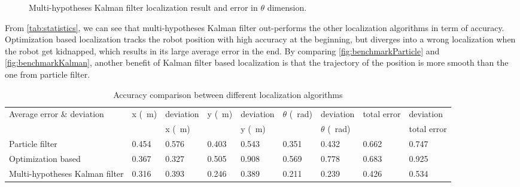 \begin{figure}[!htbp]
  \centering
    \begin{subfigure}[b]{0.9\textwidth}
      
    \end{subfigure}
    \begin{subfigure}[b]{0.9\textwidth}
      
    \end{subfigure}
  \caption{Multi-hypotheses Kalman filter localization result and error in $\theta$ dimension.}
 \label{fig:benchmarkKalman2}
\end{figure}
From \autoref{tab:statistics}, we can see that multi-hypotheses Kalman filter out-performs the other localization algorithms in term of accuracy. Optimization based localization tracks the robot position with high accuracy at the beginning, but diverges into a wrong localization when the robot get kidnapped, which results in its large average error in the end.
By comparing \autoref{fig:benchmarkParticle} and \autoref{fig:benchmarkKalman}, another benefit of Kalman filter based localization is that the trajectory of the position is more smooth than the one from particle filter.
\begin{table}[h!]
  \centering
  \caption{Accuracy comparison between different localization algorithms}
  \label{tab:statistics}
  \begin{adjustbox}{max width=\textwidth}
    \begin{tabular}{l|l|l|l|l|l|l|l|l}
      Average error  \& deviation & x (\SI{}{\meter})                   &  deviation     & y  (\SI{}{\meter})                   & deviation        & $\theta$  (\SI{}{\radian})            &deviation    & total error         &deviation           \\
      &                     & x (\SI{}{\meter})&                     &  y (\SI{}{\meter})&                     &  $\theta$ (\SI{}{\radian}) &                     & total error\\ \hline
      Particle filter                & 0.454& 0.576 & 0.403 & 0.543 & 0.351 & 0.432 & 0.662 & 0.747   \\ \hline
      Optimization based            & 0.367 & 0.327 & 0.505 & 0.908 & 0.569 & 0.778 & 0.683 & 0.925   \\ \hline
      Multi-hypotheses Kalman filter & 0.316 & 0.393 & 0.246 & 0.389 & 0.211 & 0.239 & 0.426 & 0.534  
    \end{tabular}
  \end{adjustbox}
\end{table}

